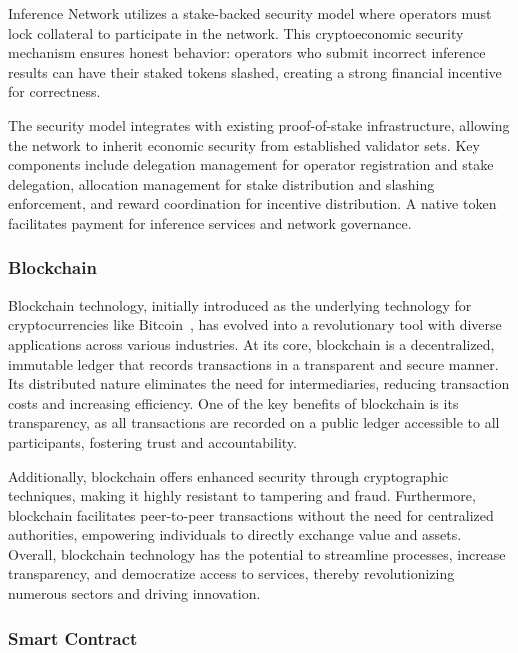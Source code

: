 \documentclass[conference]{IEEEtran}
\begin{document}
Inference Network utilizes a stake-backed security model where operators must lock collateral to participate in the network. This cryptoeconomic security mechanism ensures honest behavior: operators who submit incorrect inference results can have their staked tokens slashed, creating a strong financial incentive for correctness.

The security model integrates with existing proof-of-stake infrastructure, allowing the network to inherit economic security from established validator sets. Key components include delegation management for operator registration and stake delegation, allocation management for stake distribution and slashing enforcement, and reward coordination for incentive distribution. A native token facilitates payment for inference services and network governance.

\subsubsection{Blockchain}

Blockchain technology, initially introduced as the underlying technology for cryptocurrencies like Bitcoin~\cite{Nakamoto2008BitcoinPeerToPeer}, has evolved into a revolutionary tool with diverse applications across various industries. At its core, blockchain is a decentralized, immutable ledger that records transactions in a transparent and secure manner. Its distributed nature eliminates the need for intermediaries, reducing transaction costs and increasing efficiency. One of the key benefits of blockchain is its transparency, as all transactions are recorded on a public ledger accessible to all participants, fostering trust and accountability.

Additionally, blockchain offers enhanced security through cryptographic techniques, making it highly resistant to tampering and fraud. Furthermore, blockchain facilitates peer-to-peer transactions without the need for centralized authorities, empowering individuals to directly exchange value and assets. Overall, blockchain technology has the potential to streamline processes, increase transparency, and democratize access to services, thereby revolutionizing numerous sectors and driving innovation.

\subsubsection{Smart Contract}
\end{document}
